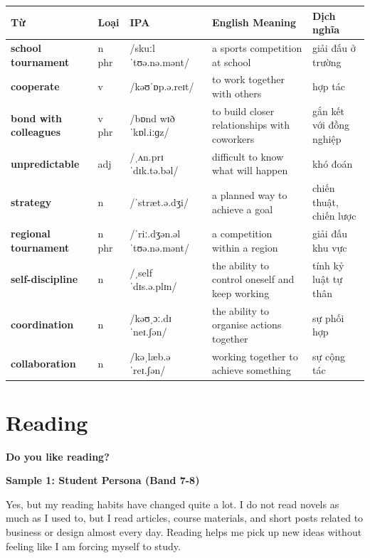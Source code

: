 \vspace{0.8em}
\begin{center}
\renewcommand{\arraystretch}{1.65}
\begin{tabularx}{\textwidth}{|V{0.22\textwidth}|C{0.07\textwidth}|I{0.20\textwidth}|Y|V{0.18\textwidth}|}
\hline
{}
\textbf{Từ} & \textbf{Loại} & \textbf{IPA} & \textbf{English Meaning} & \textbf{Dịch nghĩa} \\
\hline
\textbf{school tournament} & n phr & /skuːl ˈtʊə.nə.mənt/ & a sports competition at school & giải đấu ở trường \\ \hline
\textbf{cooperate} & v & /kəʊˈɒp.ə.reɪt/ & to work together with others & hợp tác \\ \hline
\textbf{bond with colleagues} & v phr & /bɒnd wɪð ˈkɒl.iːɡz/ & to build closer relationships with coworkers & gắn kết với đồng nghiệp \\ \hline
\textbf{unpredictable} & adj & /ˌʌn.prɪˈdɪk.tə.bəl/ & difficult to know what will happen & khó đoán \\ \hline
\textbf{strategy} & n & /ˈstræt.ə.dʒi/ & a planned way to achieve a goal & chiến thuật, chiến lược \\ \hline
\textbf{regional tournament} & n phr & /ˈriː.dʒən.əl ˈtʊə.nə.mənt/ & a competition within a region & giải đấu khu vực \\ \hline
\textbf{self-discipline} & n & /ˌself ˈdɪs.ə.plɪn/ & the ability to control oneself and keep working & tính kỷ luật tự thân \\ \hline
\textbf{coordination} & n & /kəʊˌɔː.dɪˈneɪ.ʃən/ & the ability to organise actions together & sự phối hợp \\ \hline
\textbf{collaboration} & n & /kəˌlæb.əˈreɪ.ʃən/ & working together to achieve something & sự cộng tác \\ \hline
\end{tabularx}
\end{center}

\newpage

\section{Reading}
\begin{ieltsquestion}
\textbf{Do you like reading?}
\end{ieltsquestion}
\textbf{Sample 1: Student Persona (Band 7-8)}

Yes, but my reading habits have changed quite a lot. I do not read novels as much as I used to, but I read articles, course materials, and short posts related to business or design almost every day. Reading helps me pick up new ideas without feeling like I am forcing myself to study.

